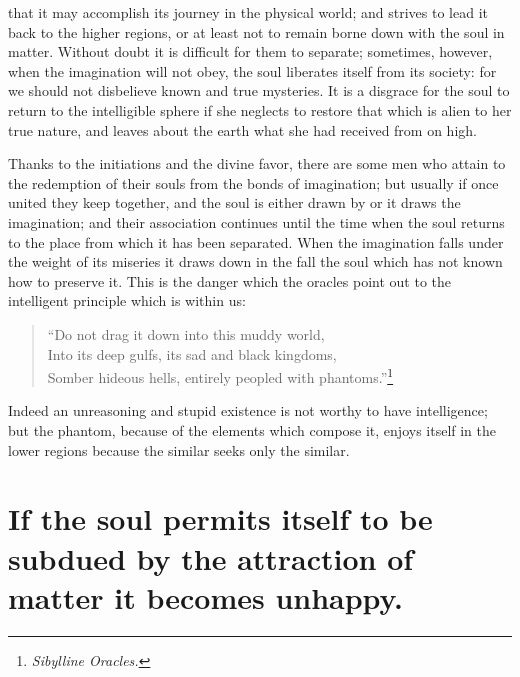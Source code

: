 \documentclass[12pt]{article}
\begin{document}
that it may accomplish its journey in the physical world; and strives to lead
it back to the higher regions, or at least not to remain borne down with the
soul in matter. Without doubt it is difficult for them to separate; sometimes,
however, when the imagination will not obey, the soul liberates itself from its
society: for we should not disbelieve known and true mysteries. It is a
disgrace for the soul to return to the intelligible sphere if she neglects to
restore that which is alien to her true nature, and leaves about the earth
what she had received from on high.

Thanks to the initiations and the divine favor, there are some men who attain
to the redemption of their souls from the bonds of imagination; but usually if
once united they keep together, and the soul is either drawn by or it draws the
imagination; and their association continues until the time when the soul
returns to the place from which it has been separated. When the imagination
falls under the weight of its miseries it draws down in the fall the soul which
has not known how to preserve it. This is the danger which the oracles point
out to the intelligent principle which is within us:

\begin{verse}
``Do not drag it down into this muddy world,\\
Into its deep gulfs, its sad and black kingdoms,\\
Somber hideous hells, entirely peopled with
phantoms.''\footnote{\textit{Sibylline Oracles.}}
\end{verse}

\noindent Indeed an unreasoning and stupid existence is not worthy to have
intelligence; but the phantom, because of the elements which compose it, enjoys
itself in the lower regions because the similar seeks only the similar.


\section{If the soul permits itself to be subdued by the attraction of matter
it becomes unhappy.}
\end{document}
